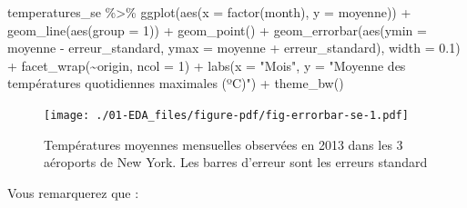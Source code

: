 \documentclass[
  a4paper,
  DIV=11,
  numbers=noendperiod,
  oneside]{scrreprt}
\newenvironment{Shaded}{}{}
\newcommand{\AttributeTok}[1]{\textcolor[rgb]{0.84,0.23,0.29}{#1}}
\newcommand{\DecValTok}[1]{\textcolor[rgb]{0.00,0.36,0.77}{#1}}
\newcommand{\FloatTok}[1]{\textcolor[rgb]{0.00,0.36,0.77}{#1}}
\newcommand{\FunctionTok}[1]{\textcolor[rgb]{0.44,0.26,0.76}{#1}}
\newcommand{\NormalTok}[1]{\textcolor[rgb]{0.14,0.16,0.18}{#1}}
\newcommand{\SpecialCharTok}[1]{\textcolor[rgb]{0.00,0.36,0.77}{#1}}
\newcommand{\StringTok}[1]{\textcolor[rgb]{0.01,0.18,0.38}{#1}}
\begin{document}
\begin{Shaded}
\begin{Highlighting}[]
\NormalTok{temperatures\_se }\SpecialCharTok{\%\textgreater{}\%} 
  \FunctionTok{ggplot}\NormalTok{(}\FunctionTok{aes}\NormalTok{(}\AttributeTok{x =} \FunctionTok{factor}\NormalTok{(month), }\AttributeTok{y =}\NormalTok{ moyenne)) }\SpecialCharTok{+}
  \FunctionTok{geom\_line}\NormalTok{(}\FunctionTok{aes}\NormalTok{(}\AttributeTok{group =} \DecValTok{1}\NormalTok{)) }\SpecialCharTok{+}
  \FunctionTok{geom\_point}\NormalTok{() }\SpecialCharTok{+}
  \FunctionTok{geom\_errorbar}\NormalTok{(}\FunctionTok{aes}\NormalTok{(}\AttributeTok{ymin =}\NormalTok{ moyenne }\SpecialCharTok{{-}}\NormalTok{ erreur\_standard,}
                    \AttributeTok{ymax =}\NormalTok{ moyenne }\SpecialCharTok{+}\NormalTok{ erreur\_standard),}
                \AttributeTok{width =} \FloatTok{0.1}\NormalTok{) }\SpecialCharTok{+}
  \FunctionTok{facet\_wrap}\NormalTok{(}\SpecialCharTok{\textasciitilde{}}\NormalTok{origin, }\AttributeTok{ncol =} \DecValTok{1}\NormalTok{) }\SpecialCharTok{+}
  \FunctionTok{labs}\NormalTok{(}\AttributeTok{x =} \StringTok{"Mois"}\NormalTok{, }
       \AttributeTok{y =} \StringTok{"Moyenne des températures quotidiennes maximales (ºC)"}\NormalTok{) }\SpecialCharTok{+}
  \FunctionTok{theme\_bw}\NormalTok{()}
\end{Highlighting}
\end{Shaded}

\begin{figure}[H]

{\centering \texttt{[image: ./01-EDA\_files/figure-pdf/fig-errorbar-se-1.pdf]}

}

\caption{\label{fig-errorbar-se}Températures moyennes mensuelles
observées en 2013 dans les 3 aéroports de New York. Les barres d'erreur
sont les erreurs standard}

\end{figure}

Vous remarquerez que :
\end{document}
